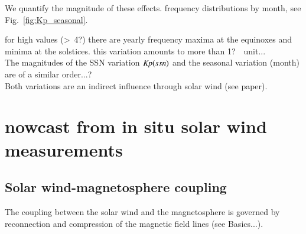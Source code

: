 We quantify the magnitude of these effects. \Kp{} frequency distributions by month, see Fig.~\ref{fig:Kp_seasonal}.\\
\begin{figure}
\end{figure}
for high \Kp{} values (>~4?) there are yearly frequency maxima at the equinoxes and minima at the solstices. this variation amounts to more than 1?~\Kp~unit...\\

The magnitudes of the SSN variation $\textit{Kp}(ssn)$ and the seasonal variation \Kp(month) are of a similar order...?\\

Both variations are an indirect influence through solar wind (see paper).\\


\section{\Kp{} nowcast from in situ solar wind measurements}

\subsection{Solar wind-magnetosphere coupling}
The coupling between the solar wind and the magnetosphere is governed by reconnection and compression of the magnetic field lines (see Basics...).\\

